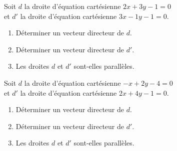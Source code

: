 \begin{minipage}{0.48\linewidth}

Soit $d$ la droite d'équation cartésienne $2x+3y-1=0$\\ et $d'$ la droite d'équation cartésienne $3x-1y-1=0$.
 
\begin{enumerate}
\item Déterminer un vecteur directeur de $d$.
\item Déterminer un vecteur directeur de $d'$.
\item Les droites $d$ et $d'$ sont-elles parallèles.
\end{enumerate}

\end{minipage}
\hfill
\begin{minipage}{0.48\linewidth}



Soit $d$ la droite d'équation cartésienne $-x+2y-4=0$\\  et $d'$ la droite d'équation cartésienne $2x+4y-1=0$.
 
\begin{enumerate}
\item Déterminer un vecteur directeur de $d$.
\item Déterminer un vecteur directeur de $d'$.
\item Les droites $d$ et $d'$ sont-elles parallèles.
\end{enumerate}

\end{minipage}
 


